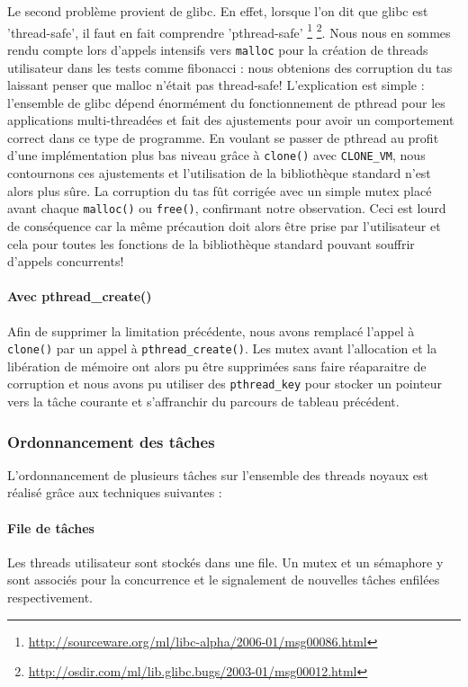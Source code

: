 Le second problème provient de glibc. En effet, lorsque l'on dit que glibc est
'thread-safe', il faut en fait comprendre 'pthread-safe'
\footnote{\url{http://sourceware.org/ml/libc-alpha/2006-01/msg00086.html}}
\footnote{\url{http://osdir.com/ml/lib.glibc.bugs/2003-01/msg00012.html}}.
Nous nous en sommes rendu compte lors d'appels intensifs vers \verb!malloc!
pour la création de threads utilisateur dans les tests comme fibonacci : nous
obtenions des corruption du tas laissant penser que malloc n'était pas
thread-safe!  L'explication est simple : l'ensemble de glibc dépend énormément
du fonctionnement de pthread pour les applications multi-threadées et fait des
ajustements pour avoir un comportement correct dans ce type de programme. En
voulant se passer de pthread au profit d'une implémentation plus bas niveau
grâce à \verb!clone()! avec \verb!CLONE_VM!, nous contournons ces ajustements
et l'utilisation de la bibliothèque standard n'est alors plus sûre. La
corruption du tas fût corrigée avec un simple mutex placé avant chaque
\verb!malloc()! ou \verb!free()!, confirmant notre observation. Ceci est lourd
de conséquence car la même précaution doit alors être prise par l'utilisateur
et cela pour toutes les fonctions de la bibliothèque standard pouvant souffrir
d'appels concurrents!


\paragraph{Avec pthread\_create()}
Afin de supprimer la limitation précédente, nous avons remplacé l'appel à \verb!clone()! par un appel à \verb!pthread_create()!. Les mutex avant l'allocation et la libération de mémoire ont alors pu être supprimées sans faire réaparaitre de corruption et nous avons pu utiliser des \verb!pthread_key! pour stocker un pointeur vers la tâche courante et s'affranchir du parcours de tableau précédent.


\subsubsection{Ordonnancement des tâches}

L'ordonnancement de plusieurs tâches sur l'ensemble des threads noyaux est réalisé grâce aux techniques suivantes :

\paragraph{File de tâches} Les threads utilisateur sont stockés dans une file. Un mutex et un sémaphore y sont associés pour la concurrence et le signalement de nouvelles tâches enfilées respectivement.


